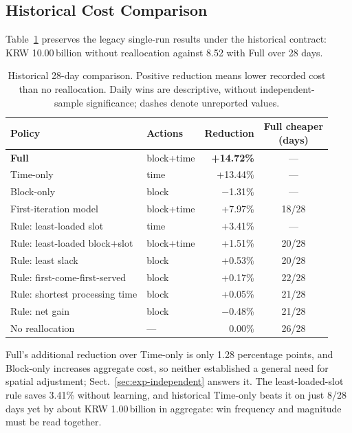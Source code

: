 \documentclass[a4paper]{llncs}
\begin{document}
\subsection{Historical Cost Comparison}
\label{sec:exp-paired}
Table~\ref{tab:main} preserves the legacy single-run results under the
historical contract: KRW 10.00\,billion without reallocation against
8.52 with Full over 28 days.
\begin{table}[htbp]
\centering
\caption{Historical 28-day comparison. Positive reduction means lower
recorded cost than no reallocation. Daily wins are descriptive, without
independent-sample significance; dashes denote unreported values.}
\label{tab:main}
\small
\setlength{\tabcolsep}{5pt}
\begin{tabular}{@{}llrc@{}}
\toprule
Policy & Actions & Reduction & \shortstack{Full cheaper\\(days)} \\
\midrule
\textbf{Full} & block+time & \textbf{+14.72\%} & --- \\
Time-only & time & +13.44\% & --- \\
Block-only & block & $-$1.31\% & --- \\
First-iteration model & block+time & +7.97\% & 18/28 \\
\midrule
Rule: least-loaded slot & time & +3.41\% & --- \\
Rule: least-loaded block+slot & block+time & +1.51\% & 20/28 \\
Rule: least slack & block & +0.53\% & 20/28 \\
Rule: first-come-first-served & block & +0.17\% & 22/28 \\
Rule: shortest processing time & block & +0.05\% & 21/28 \\
Rule: net gain & block & $-$0.48\% & 21/28 \\
\midrule
No reallocation & --- & 0.00\% & 26/28 \\
\bottomrule
\end{tabular}
\end{table}

Full's additional reduction over Time-only is only 1.28 percentage
points, and Block-only increases aggregate cost, so neither established
a general need for spatial adjustment; Sect.~\ref{sec:exp-independent}
answers it. The least-loaded-slot rule saves 3.41\% without learning,
and historical Time-only beats it on just 8/28 days yet by about
KRW 1.00\,billion in aggregate: win frequency and magnitude must be read
together.
\end{document}
